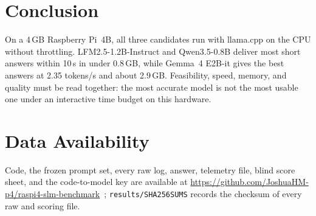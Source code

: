 \documentclass[conference]{IEEEtran}
\newcommand{\qwen}{Qwen3.5-0.8B}
\newcommand{\lfm}{LFM2.5-1.2B-Instruct}
\newcommand{\gemma}{Gemma~4 E2B-it}
\begin{document}
\section{Conclusion}
On a 4\,GB Raspberry Pi~4B, all three candidates run with llama.cpp on the CPU without throttling. \lfm{} and \qwen{} deliver most short answers within 10\,s in under 0.8\,GB, while \gemma{} gives the best answers at 2.35 tokens/s and about 2.9\,GB. Feasibility, speed, memory, and quality must be read together: the most accurate model is not the most usable one under an interactive time budget on this hardware.

\section*{Data Availability}
Code, the frozen prompt set, every raw log, answer, telemetry file, blind score sheet, and the code-to-model key are available at \url{https://github.com/JoshuaHM-p4/raspi4-slm-benchmark}~\cite{repo}; \texttt{results/SHA256SUMS} records the checksum of every raw and scoring file.



\end{document}
